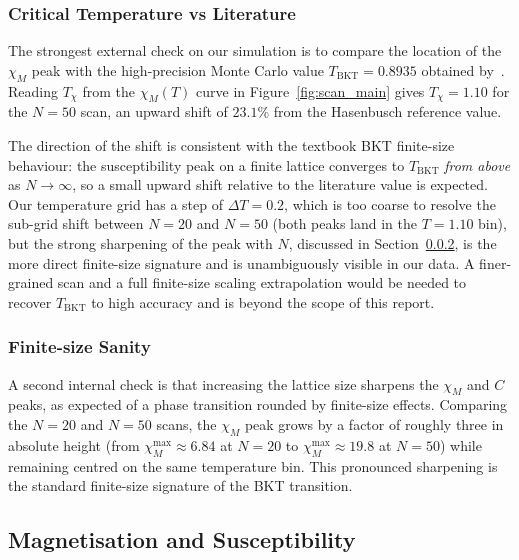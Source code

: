 \documentclass[11pt,a4paper]{article}
\begin{document}
\subsubsection{Critical Temperature vs Literature}
\label{sec:tc_validation}

The strongest external check on our simulation is to compare the location of the $\chi_M$ peak with the high-precision Monte Carlo value $T_{\mathrm{BKT}} = 0.8935$ obtained by~\citet{hasenbusch2005}. Reading $T_\chi$ from the $\chi_M(T)$ curve in Figure~\ref{fig:scan_main} gives $T_\chi = 1.10$ for the $N = 50$ scan, an upward shift of $23.1\%$ from the Hasenbusch reference value.

The direction of the shift is consistent with the textbook BKT finite-size behaviour: the susceptibility peak on a finite lattice converges to $T_{\mathrm{BKT}}$ \emph{from above} as $N \to \infty$, so a small upward shift relative to the literature value is expected. Our temperature grid has a step of $\Delta T = 0.2$, which is too coarse to resolve the sub-grid shift between $N = 20$ and $N = 50$ (both peaks land in the $T = 1.10$ bin), but the strong sharpening of the peak with $N$, discussed in Section~\ref{sec:fs_sanity}, is the more direct finite-size signature and is unambiguously visible in our data. A finer-grained scan and a full finite-size scaling extrapolation would be needed to recover $T_{\mathrm{BKT}}$ to high accuracy and is beyond the scope of this report.

\subsubsection{Finite-size Sanity}
\label{sec:fs_sanity}

A second internal check is that increasing the lattice size sharpens the $\chi_M$ and $C$ peaks, as expected of a phase transition rounded by finite-size effects. Comparing the $N = 20$ and $N = 50$ scans, the $\chi_M$ peak grows by a factor of roughly three in absolute height (from $\chi_M^{\max} \approx 6.84$ at $N = 20$ to $\chi_M^{\max} \approx 19.8$ at $N = 50$) while remaining centred on the same temperature bin. This pronounced sharpening is the standard finite-size signature of the BKT transition.

\subsection{Magnetisation and Susceptibility}
\label{sec:magnetisation}
\end{document}
